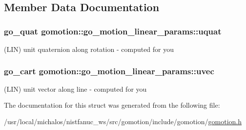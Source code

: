 \subsection{Member Data Documentation}
\hypertarget{structgomotion_1_1go__motion__linear__params_af354e180468997cc31fca9f21a9bc325}{
\subsubsection[{uquat}]{\setlength{\rightskip}{0pt plus 5cm}go\-\_\-quat gomotion\-::go\-\_\-motion\-\_\-linear\-\_\-params\-::uquat}}\label{structgomotion_1_1go__motion__linear__params_af354e180468997cc31fca9f21a9bc325}
(L\-I\-N) unit quaternion along rotation -\/ computed for you \hypertarget{structgomotion_1_1go__motion__linear__params_ab1865f783998b55efb3c97f62e6a4f7d}{
\subsubsection[{uvec}]{\setlength{\rightskip}{0pt plus 5cm}go\-\_\-cart gomotion\-::go\-\_\-motion\-\_\-linear\-\_\-params\-::uvec}}\label{structgomotion_1_1go__motion__linear__params_ab1865f783998b55efb3c97f62e6a4f7d}
(L\-I\-N) unit vector along line -\/ computed for you 

The documentation for this struct was generated from the following file\-:\begin{DoxyCompactItemize}
\item 
/usr/local/michalos/nistfanuc\-\_\-ws/src/gomotion/include/gomotion/\hyperlink{gomotion_8h}{gomotion.\-h}\end{DoxyCompactItemize}
